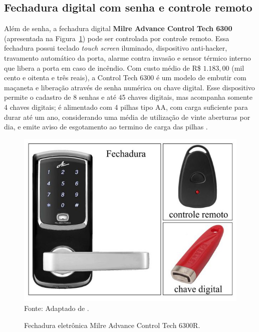  \subsection{Fechadura digital com senha e controle remoto}

 Além de senha, a fechadura digital \textbf{Milre Advance Control Tech 6300} (apresentada na Figura~\ref{milre6300}) pode ser controlada por controle remoto. Essa fechadura possui teclado \textit{touch screen} iluminado, dispositivo anti-hacker, travamento automático da porta, alarme contra invasão e sensor térmico interno que libera a porta em caso de incêndio. Com custo médio de R{\$} $1.183,00$ (mil cento e oitenta e três reais), a Control Tech 6300 é um modelo de embutir com maçaneta e liberação através de senha numérica ou chave digital. Esse dispositivo permite o cadastro de 8 senhas e até 45 chaves digitais, mas acompanha somente 4 chaves digitais; é alimentado com 4 pilhas tipo AA, com carga suficiente para durar até um ano, considerando uma média de utilização de vinte aberturas por dia, e emite aviso de esgotamento ao termino de carga das  pilhas \cite{milre6300}.

  \begin{figure}[!ht]
  \begin{center}
  \caption{Fechadura eletrônica Milre Advance Control Tech 6300R.}
  \includegraphics[scale=0.6]{figuras/cap3/milre6300.jpg}\\
  Fonte: Adaptado de \cite{milre6300}.
  \label{milre6300}
  \end{center}
  \end{figure}


